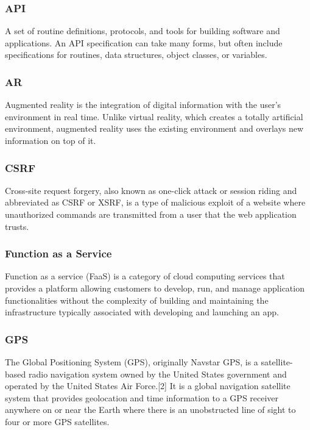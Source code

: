 

\subsubsection*{API}

A set of routine definitions, protocols, and tools for building software and applications. An API specification can take many forms, but often include specifications for routines, data structures, object classes, or variables.

\subsubsection*{AR}

Augmented reality is the integration of digital information with the user's environment in real time. Unlike virtual reality, which creates a totally artificial environment, augmented reality uses the existing environment and overlays new information on top of it.

\subsubsection*{CSRF}

Cross-site request forgery, also known as one-click attack or session riding and abbreviated as CSRF or XSRF, is a type of malicious exploit of a website where unauthorized commands are transmitted from a user that the web application trusts.\cite{Ristic2005}

\subsubsection*{Function as a Service}

Function as a service (FaaS) is a category of cloud computing services that provides a platform allowing customers to develop, run, and manage application functionalities without the complexity of building and maintaining the infrastructure typically associated with developing and launching an app.\cite{roberts_2018}

\subsubsection*{GPS}

The Global Positioning System (GPS), originally Navstar GPS, is a satellite-based radio navigation system owned by the United States government and operated by the United States Air Force.[2] It is a global navigation satellite system that provides geolocation and time information to a GPS receiver anywhere on or near the Earth where there is an unobstructed line of sight to four or more GPS satellites.


